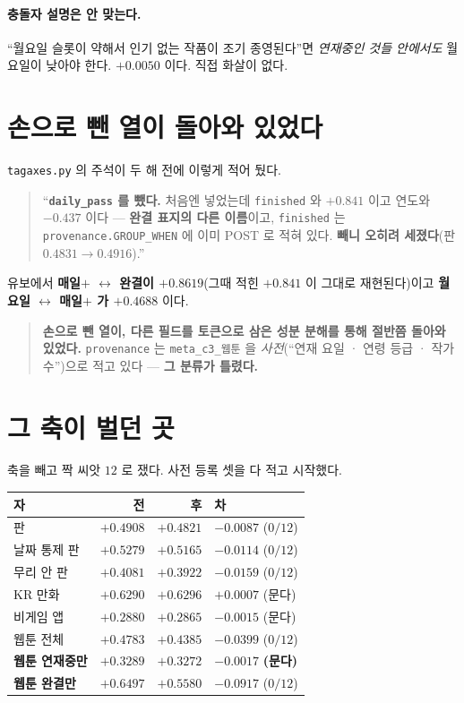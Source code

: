 \documentclass[11pt]{article}
\begin{document}
\paragraph{충돌자 설명은 안 맞는다.} ``월요일 슬롯이 약해서 인기 없는
작품이 조기 종영된다''면 \emph{연재중인 것들 안에서도} 월요일이 낮아야
한다. $+0.0050$ 이다. 직접 화살이 없다.

\section{손으로 뺀 열이 돌아와 있었다}

\texttt{tagaxes.py} 의 주석이 두 해 전에 이렇게 적어 뒀다.

\begin{quote}
``\textbf{\texttt{daily\_pass} 를 뺐다.} 처음엔 넣었는데 \texttt{finished}
와 $+0.841$ 이고 연도와 $-0.437$ 이다 --- \textbf{완결 표지의 다른
이름}이고, \texttt{finished} 는 \texttt{provenance.GROUP\_WHEN} 에 이미
POST 로 적혀 있다. \textbf{빼니 오히려 세졌다}(판 $0.4831 \to 0.4916$).''
\end{quote}

유보에서 \textbf{매일$+$ $\leftrightarrow$ 완결이 $+0.8619$}(그때 적힌
$+0.841$ 이 그대로 재현된다)이고 \textbf{월요일 $\leftrightarrow$ 매일$+$
가 $+0.4688$} 이다.

\begin{quote}
\textbf{손으로 뺀 열이, 다른 필드를 토큰으로 삼은 성분 분해를 통해 절반쯤
돌아와 있었다.} \texttt{provenance} 는 \texttt{meta\_c3\_웹툰} 을
\emph{사전}(``연재 요일 · 연령 등급 · 작가 수'')으로 적고 있다 ---
\textbf{그 분류가 틀렸다.}
\end{quote}

\section{그 축이 벌던 곳}

축을 빼고 짝 씨앗 $12$ 로 쟀다. 사전 등록 셋을 다 적고 시작했다.

\begin{center}
\begin{tabular}{lrrl}
\hline
자 & 전 & 후 & 차 \\
\hline
판 & $+0.4908$ & $+0.4821$ & $-0.0087$ ($0/12$) \\
날짜 통제 판 & $+0.5279$ & $+0.5165$ & $-0.0114$ ($0/12$) \\
무리 안 판 & $+0.4081$ & $+0.3922$ & $-0.0159$ ($0/12$) \\
KR 만화 & $+0.6290$ & $+0.6296$ & $+0.0007$ (문다) \\
비게임 앱 & $+0.2880$ & $+0.2865$ & $-0.0015$ (문다) \\
\hline
웹툰 전체 & $+0.4783$ & $+0.4385$ & $-0.0399$ ($0/12$) \\
\textbf{웹툰 연재중만} & $+0.3289$ & $+0.3272$ & $\mathbf{-0.0017}$
\textbf{(문다)} \\
\textbf{웹툰 완결만} & $+0.6497$ & $+0.5580$ & $\mathbf{-0.0917}$ ($0/12$) \\
\hline
\end{tabular}
\end{center}
\end{document}
